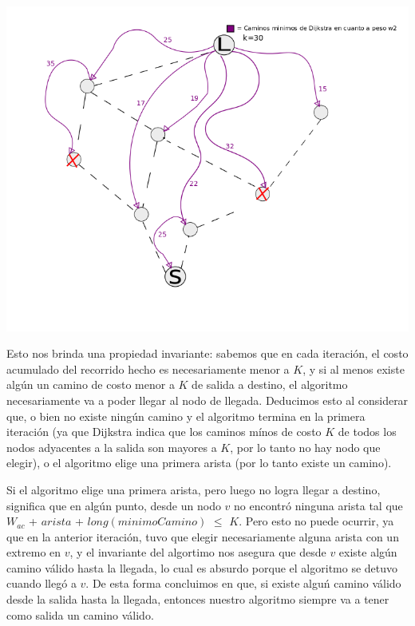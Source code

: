 \begin{center}
\includegraphics[scale=0.6]{inicializacion.png}
\end{center}
\vspace{2mm}



Esto nos brinda una propiedad invariante: sabemos que en cada iteraci\'on, el costo acumulado del recorrido hecho es necesariamente menor a $K$, y si al menos existe alg\'un un camino de costo menor a $K$ de salida a destino, el algoritmo necesariamente va a poder llegar al nodo de llegada. Deducimos esto al considerar que, o bien no existe ning\'un camino y  el algoritmo termina en la primera iteraci\'on (ya que Dijkstra indica que los caminos m\'inos de costo $K$ de todos los nodos adyacentes a la salida son mayores a $K$, por lo tanto no hay nodo que elegir), o el algoritmo elige una primera arista (por lo tanto existe un camino). 

\vspace{2mm}

Si el algoritmo elige una primera arista, pero luego no logra llegar a destino, significa que en alg\'un punto, desde un nodo $v$ no encontr\'o ninguna arista tal que $W_{ac}$ + $arista$ + $long(minimoCamino)$ $\leq$ $K$. Pero esto no puede ocurrir, ya que en la anterior iteraci\'on, tuvo que elegir necesariamente alguna arista con un extremo en $v$, y el invariante del algortimo nos asegura que desde $v$ existe alg\'un camino v\'alido hasta la llegada, lo cual es absurdo porque el algoritmo se detuvo cuando lleg\'o a $v$. De esta forma concluimos en que, si existe algu\'n camino v\'alido desde la salida hasta la llegada, entonces nuestro algoritmo siempre va a tener como salida un camino v\'alido.

